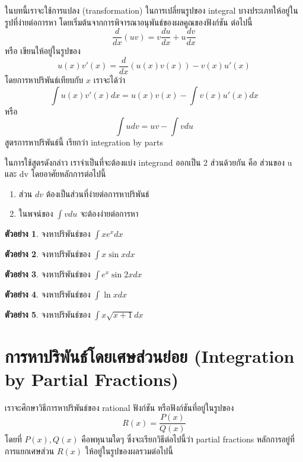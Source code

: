 \documentclass[
]{book}
\theoremstyle{definition}
\theoremstyle{definition}
\newtheorem{example}{ตัวอย่าง}[chapter]
\theoremstyle{definition}
\theoremstyle{definition}
\theoremstyle{remark}
\begin{document}
ในบทนี้เราจะใช้การแปลง (transformation) ในการเปลี่ยนรูปของ integral
บางประเภทให้อยู่ในรูปที่ง่ายต่อการหา โดยเริ่มต้นจากการพิจารณาอนุพันธ์ของผลคูณของฟังก์ชัน
ต่อไปนี้ \[\frac{d}{dx} (uv) = v\frac{du}{dx} + u\frac{dv}{dx}\] หรือ
เขียนให้อยู่ในรูปของ \[u(x) v'(x) = \frac{d}{dx}(u(x)v(x)) - v(x)u'(x)\]
โดยการหาปริพันธ์เทียบกับ \(x\) เราจะได้ว่า
\[\int u(x) v'(x) dx = u(x)v(x) -  \int v(x)u'(x)dx\] หรือ
\[\int u dv = uv -  \int v du\] สูตรการหาปริพันธ์นี้ เรียกว่า integration by
parts

ในการใช้สูตรดังกล่าว เราจำเป็นที่จะต้องแบ่ง integrand ออกเป็น 2 ส่วนด้วยกัน คือ ส่วนของ
u และ dv โดยอาศัยหลักการต่อไปนี้

\begin{enumerate}
\def\labelenumi{\arabic{enumi}.}
\item
  ส่วน \(dv\) ต้องเป็นส่วนที่ง่ายต่อการหาปริพันธ์
\item
  ในพจน์ของ \(\int v du\) จะต้องง่ายต่อการหา
\end{enumerate}

\begin{example}
จงหาปริพันธ์ของ \(\int x e^x dx\)
\end{example}

\begin{example}
จงหาปริพันธ์ของ \(\int x \sin x dx\)
\end{example}

\begin{example}
จงหาปริพันธ์ของ \(\int e^x \sin 2x dx\)
\end{example}

\begin{example}
จงหาปริพันธ์ของ \(\int \ln xdx\)
\end{example}

\begin{example}
จงหาปริพันธ์ของ \(\int x \sqrt{x+1}dx\)
\end{example}

\section{การหาปริพันธ์โดยเศษส่วนย่อย (Integration by Partial Fractions)}\label{uxe01uxe32uxe23uxe2buxe32uxe1buxe23uxe1euxe19uxe18uxe42uxe14uxe22uxe40uxe28uxe29uxe2auxe27uxe19uxe22uxe2duxe22-integration-by-partial-fractions}

เราจะศึกษาวิธีการหาปริพันธ์ของ rational ฟังก์ชัน หรือฟังก์ชันที่อยู่ในรูปของ
\[R(x) = \frac{P(x)}{Q(x)}\] โดยที่ \(P(x),Q(x)\) คือพหุนามใดๆ
ซึ่งจะเรียกวิธีต่อไปนี้ว่า partial fractions หลักการอยู่ที่การแยกเศษส่วน \(R(x)\)
ให้อยู่ในรูปของผลรวมต่อไปนี้
\end{document}
